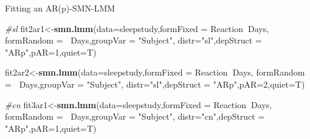 \documentclass[
  ignorenonframetext,
]{beamer}
\newenvironment{Shaded}{\begin{snugshade}}{\end{snugshade}}
\newcommand{\CommentTok}[1]{\textcolor[rgb]{0.56,0.35,0.01}{\textit{#1}}}
\newcommand{\DataTypeTok}[1]{\textcolor[rgb]{0.13,0.29,0.53}{#1}}
\newcommand{\DecValTok}[1]{\textcolor[rgb]{0.00,0.00,0.81}{#1}}
\newcommand{\KeywordTok}[1]{\textcolor[rgb]{0.13,0.29,0.53}{\textbf{#1}}}
\newcommand{\NormalTok}[1]{#1}
\newcommand{\OperatorTok}[1]{\textcolor[rgb]{0.81,0.36,0.00}{\textbf{#1}}}
\newcommand{\StringTok}[1]{\textcolor[rgb]{0.31,0.60,0.02}{#1}}
\begin{document}
\begin{frame}[fragile]{Fitting an AR(p)-SMN-LMM}
\protect\hypertarget{fitting-an-arp-smn-lmm}{}

\small

\begin{Shaded}
\begin{Highlighting}[]
\CommentTok{#sl}
\NormalTok{fit2ar1<-}\KeywordTok{smn.lmm}\NormalTok{(}\DataTypeTok{data=}\NormalTok{sleepstudy,}\DataTypeTok{formFixed =}\NormalTok{ Reaction}\OperatorTok{~}\NormalTok{Days,}
                 \DataTypeTok{formRandom =} \OperatorTok{~}\NormalTok{Days,}\DataTypeTok{groupVar =} \StringTok{"Subject"}\NormalTok{,}
                 \DataTypeTok{distr=}\StringTok{"sl"}\NormalTok{,}\DataTypeTok{depStruct =} \StringTok{"ARp"}\NormalTok{,}\DataTypeTok{pAR=}\DecValTok{1}\NormalTok{,}\DataTypeTok{quiet=}\NormalTok{T)}
\end{Highlighting}
\end{Shaded}

\begin{Shaded}
\begin{Highlighting}[]
\NormalTok{fit2ar2<-}\KeywordTok{smn.lmm}\NormalTok{(}\DataTypeTok{data=}\NormalTok{sleepstudy,}\DataTypeTok{formFixed =}\NormalTok{ Reaction}\OperatorTok{~}\NormalTok{Days,}
                 \DataTypeTok{formRandom =} \OperatorTok{~}\NormalTok{Days,}\DataTypeTok{groupVar =} \StringTok{"Subject"}\NormalTok{,}
                 \DataTypeTok{distr=}\StringTok{"sl"}\NormalTok{,}\DataTypeTok{depStruct =} \StringTok{"ARp"}\NormalTok{,}\DataTypeTok{pAR=}\DecValTok{2}\NormalTok{,}\DataTypeTok{quiet=}\NormalTok{T)}
\end{Highlighting}
\end{Shaded}

\begin{Shaded}
\begin{Highlighting}[]
\CommentTok{#cn}
\NormalTok{fit3ar1<-}\KeywordTok{smn.lmm}\NormalTok{(}\DataTypeTok{data=}\NormalTok{sleepstudy,}\DataTypeTok{formFixed =}\NormalTok{ Reaction}\OperatorTok{~}\NormalTok{Days,}
                 \DataTypeTok{formRandom =} \OperatorTok{~}\NormalTok{Days,}\DataTypeTok{groupVar =} \StringTok{"Subject"}\NormalTok{,}
                 \DataTypeTok{distr=}\StringTok{"cn"}\NormalTok{,}\DataTypeTok{depStruct =} \StringTok{"ARp"}\NormalTok{,}\DataTypeTok{pAR=}\DecValTok{1}\NormalTok{,}\DataTypeTok{quiet=}\NormalTok{T)}
\end{Highlighting}
\end{Shaded}


\end{frame}
\end{document}
